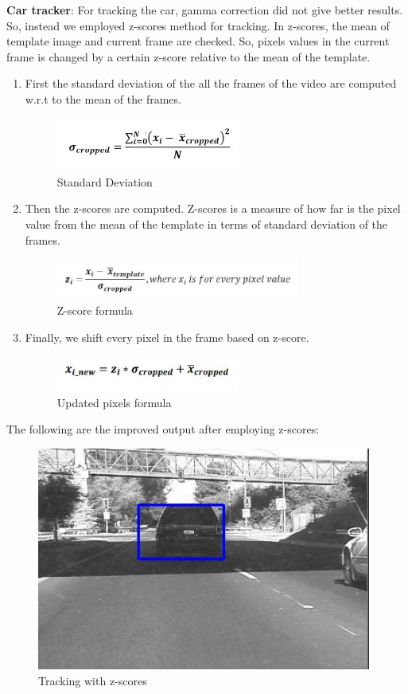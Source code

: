 \documentclass[12pt]{article}
\begin{document}
\textbf{Car tracker}: For tracking the car, gamma correction did not give better results. So, instead we employed z-scores method for tracking. In z-scores, the mean of template image and current frame are checked. So, pixels values in the current frame is changed by a certain z-score relative to the mean of the template. 
\begin{enumerate}
\item First the standard deviation of the all the frames of the video are computed w.r.t to the mean of the frames.
\begin{figure}[h]
    \centering
    \includegraphics[width=6cm]{zscore}
    \caption{Standard Deviation}
    \label{fig:Standard Deviation}
\end{figure}
\item Then the z-scores are computed. Z-scores is a measure of how far is the pixel value from the mean of the template in terms of standard deviation of the frames.
\begin{figure}[h]
    \centering
    \includegraphics[width=8cm]{zscore1}
    \caption{Z-score formula}
    \label{fig:Z- score formula}
\end{figure}
\item Finally, we shift every pixel in the frame based on z-score.
\begin{figure}[h]
    \centering
    \includegraphics[width=6cm]{zscore2}
    \caption{Updated pixels formula}
    \label{fig:Updated pixels formula}
\end{figure}
\end{enumerate}
The following are the improved output after employing z-scores:
\newpage
\begin{figure}[h]
    \centering
    \includegraphics[width=11cm]{trackcar4}
    \caption{Tracking with z-scores}
    \label{fig:Tracking with z-scores}
\end{figure}
\end{document}
